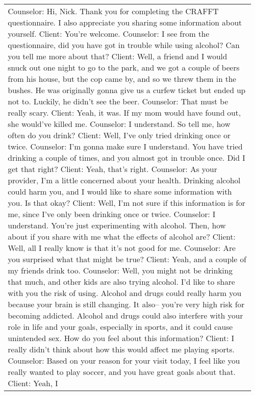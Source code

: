 \begin{table*}[tb]
\begin{tabularx}{\textwidth}{X}
\toprule
Counselor: Hi, Nick. Thank you for completing the CRAFFT questionnaire. I also appreciate you sharing some information about yourself. \newline Client: You're welcome. \newline Counselor: I see from the questionnaire, did you have got in trouble while using alcohol? Can you tell me more about that? \newline Client: Well, a friend and I would snuck out one night to go to the park, and we got a couple of beers from his house, but the cop came by, and so we threw them in the bushes. He was originally gonna give us a curfew ticket but ended up not to. Luckily, he didn't see the beer. \newline Counselor: That must be really scary. \newline Client: Yeah, it was. If my mom would have found out, she would've killed me. \newline Counselor: I understand. So tell me, how often do you drink? \newline Client: Well, I've only tried drinking once or twice. \newline Counselor: I'm gonna make sure I understand. You have tried drinking a couple of times, and you almost got in trouble once. Did I get that right? \newline Client: Yeah, that's right. \newline Counselor: As your provider, I'm a little concerned about your health. Drinking alcohol could harm you, and I would like to share some information with you. Is that okay? \newline Client: Well, I'm not sure if this information is for me, since I've only been drinking once or twice. \newline Counselor: I understand. You're just experimenting with alcohol. Then, how about if you share with me what the effects of alcohol are? \newline Client: Well, all I really know is that it's not good for me. \newline Counselor: Are you surprised what that might be true? \newline Client: Yeah, and a couple of my friends drink too. \newline Counselor: Well, you might not be drinking that much, and other kids are also trying alcohol. I'd like to share with you the risk of using. Alcohol and drugs could really harm you because your brain is still changing. It also-- you're very high risk for becoming addicted. Alcohol and drugs could also interfere with your role in life and your goals, especially in sports, and it could cause unintended sex. How do you feel about this information? \newline Client: I really didn't think about how this would affect me playing sports. \newline Counselor: Based on your reason for your visit today, I feel like you really wanted to play soccer, and you have great goals about that. \newline Client: Yeah, I 
\end{tabularx}
\end{table*}
